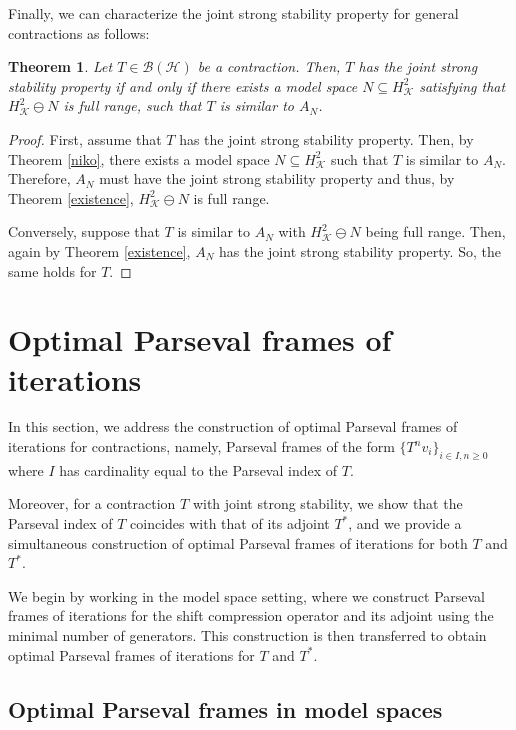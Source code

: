 \documentclass[a4paper,12pt]{amsart}
\def\HH{{\mathcal{H}}}
\def\KK{{\mathcal{K}}}
\newtheorem{theorem}{Theorem}[section]
\theoremstyle{definition}
\begin{document}
Finally, we can characterize the joint strong stability property for general contractions as follows:

\begin{theorem}
Let $T\in\mathcal B(\HH)$ be a contraction. Then, $T$ has the joint strong stability property if and only if there exists a model space $N\subseteq H^2_\KK$ satisfying that $H^2_{\KK}\ominus N$ is full range, such that $T$ is similar to $A_N$. 


\end{theorem}
\begin{proof}
First, assume that $T$ has the joint strong stability property. Then, by Theorem \ref{niko}, there exists a model space $N\subseteq H^2_\KK$ such that $T$ is similar to $A_N$. Therefore, $A_N$ must have the joint strong stability property and thus, by Theorem \ref{existence}, $H^2_{\KK}\ominus N$ is full range.

Conversely, suppose that $T$ is similar to $A_N$ with $H^2_{\KK}\ominus N$ being full range. Then, again by Theorem \ref{existence}, $A_N$ has the joint strong stability property. So, the same holds for $T$. 

\end{proof}

\section{Optimal Parseval frames of iterations}\label{optimal}

In this section, we address the construction of optimal Parseval frames of iterations for contractions, namely, Parseval frames of the form $\{T^n v_i\}_{i\in I,n\geqslant0}$ where $I$ has cardinality equal to the Parseval index of $T$.

Moreover, for a contraction $T$ with joint strong stability, we show that the Parseval index of $T$ coincides with that of its adjoint $T^*$, and we provide a simultaneous construction of optimal Parseval frames of iterations for both $T$ and $T^*$.


We begin by working in the model space setting, where we construct Parseval frames of iterations for the shift compression operator and its adjoint using the minimal number of generators. This construction is then transferred to obtain optimal Parseval frames of iterations for $T$ and $T^*$.




\subsection{Optimal Parseval frames in model spaces}
\end{document}
